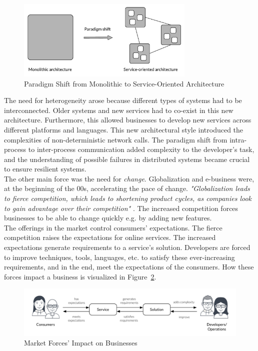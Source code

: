 \begin{figure}[H]
	\centering
	\includegraphics[width=8.5cm]{figures/paradigm_shift_monolithic_microservices}
	\caption{Paradigm Shift from Monolithic to Service-Oriented Architecture}
	\label{fig:paradigm_shift}
\end{figure}

\noindent
The need for heterogeneity arose because different types of systems had to be interconnected. Older systems and new services had to co-exist in this new architecture. Furthermore, this allowed businesses to develop new services across different platforms and languages. This new architectural style introduced the complexities of non-deterministic network calls. The paradigm shift from intra-process to inter-process communication added complexity to the developer's task, and the understanding of possible failures in distributed systems became crucial to ensure resilient systems. \\

\noindent
The other main force was the need for \textit{change}. Globalization and e-business were, at the beginning of the 00s, accelerating the pace of change. \textit{"Globalization leads to fierce competition, which leads to shortening product cycles, as companies look to gain advantage over their competition"} \cite[p. 18]{endrei2004patterns}. The increased competition forces businesses to be able to change quickly e.g. by adding new features. \\

\noindent
The offerings in the market control consumers' expectations. The fierce competition raises the expectations for online services. The increased expectations generate requirements to a service's solution. Developers are forced to improve techniques, tools, languages, etc. to satisfy these ever-increasing requirements, and in the end, meet the expectations of the consumers. How these forces impact a business is visualized in Figure~\ref{fig:customers_expectations}.

\begin{figure}[H]
	\centering
	\includegraphics[width=\textwidth]{figures/paradigm_shift_why}
	\caption{Market Forces' Impact on Businesses}
	\label{fig:customers_expectations}
\end{figure}

